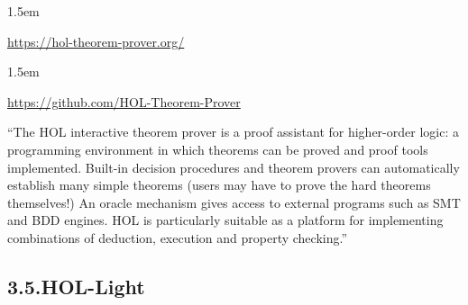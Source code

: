 \documentclass[12pt,twoside]{article}
\begin{document}
\begin{mddefinitions}%


\begin{mdbmarginx}{}{}{}{1.5em}%
\begin{mddefdata}%
\href{https://hol-theorem-prover.org/}{{\ttfamily https://\hspace{0pt}hol-\hspace{0pt}theorem-\hspace{0pt}prover.\hspace{0pt}org/\hspace{0pt}}}
\end{mddefdata}%
\end{mdbmarginx}%


\begin{mdbmarginx}{}{}{}{1.5em}%
\begin{mddefdata}%
\href{https://github.com/HOL-Theorem-Prover}{{\ttfamily https://\hspace{0pt}github.\hspace{0pt}com/\hspace{0pt}HOL-\hspace{0pt}Theorem-\hspace{0pt}Prover}}%
\end{mddefdata}%
\end{mdbmarginx}%
\end{mddefinitions}%

\noindent{}\textquotedblleft{}The HOL interactive theorem prover is a proof assistant for
higher-order logic: a programming environment in which theorems can be
proved and proof tools implemented. Built-in decision procedures and
theorem provers can automatically establish many simple theorems
(users may have to prove the hard theorems themselves!) An oracle
mechanism gives access to external programs such as SMT and BDD
engines. HOL is particularly suitable as a platform for implementing
combinations of deduction, execution and property checking.\textquotedblright{}%

\subsection{3.5.\hspace*{0.5em}HOL-Light}\label{sec-hol-light}%
\end{document}
